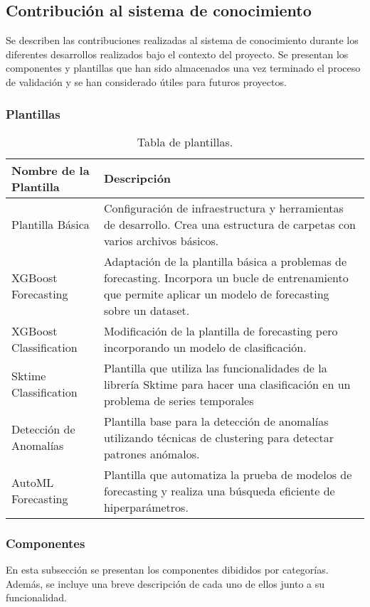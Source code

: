 \subsection{Contribución al sistema de conocimiento}
Se describen las contribuciones realizadas al sistema de conocimiento
durante los diferentes desarrollos realizados bajo el contexto del proyecto. 
Se presentan los componentes y plantillas que han sido almacenados una vez
terminado el proceso de validación y se han considerado útiles para futuros
proyectos.

\subsubsection{Plantillas}
\begin{table}[h!]
    \centering
    \begin{tabular}{| m{4cm} | m{8cm} |}
      \hline
      \textbf{Nombre de la Plantilla} & \textbf{Descripción} \\ 
      \hline
      Plantilla Básica & Configuración de infraestructura y herramientas de desarrollo.
      Crea una estructura de carpetas con varios archivos básicos. \\ 
      \hline
      XGBoost Forecasting & Adaptación de la plantilla básica a problemas de forecasting.
      Incorpora un bucle de entrenamiento que permite aplicar un modelo de forecasting sobre un dataset.\\ 
      \hline
      XGBoost Classification & Modificación de la plantilla de forecasting pero incorporando un modelo
      de clasificación.\\ 
      \hline
      Sktime Classification & Plantilla que utiliza las funcionalidades de la librería 
      Sktime para hacer una clasificación en un problema de series temporales \\ 
      \hline
      Detección de Anomalías & Plantilla base para la detección de anomalías 
      utilizando técnicas de clustering para detectar patrones anómalos.\\ 
      \hline
      AutoML Forecasting &  Plantilla que automatiza la prueba de modelos 
      de forecasting y realiza una búsqueda eficiente de hiperparámetros.\\ 
      \hline
    \end{tabular}
    \caption{Tabla de plantillas.}
    \label{table:templates}
\end{table}

\subsubsection{Componentes}
En esta subsección se presentan los componentes dibididos por categorías.
Además, se incluye una breve descripción de cada uno de ellos junto a su funcionalidad.

